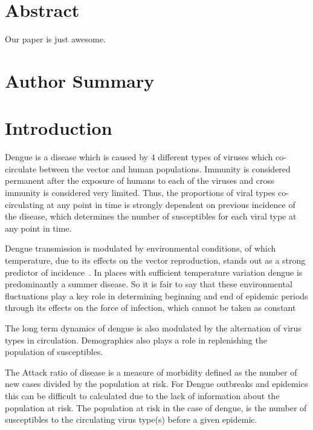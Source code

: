 \section*{Abstract}
Our paper is just awesome.
\section*{Author Summary}

\section*{Introduction}

Dengue is a disease which is caused by 4 different types of viruses 
which co-circulate between the vector and human populations. Immunity is 
considered permanent after the exposure of humans to each of the viruses and 
cross immunity is considered very limited\cite{halstead_dengue_2007}.
Thus, the proportions of viral types co-circulating at any point in time is 
strongly dependent on previous incidence of the disease, which determines the 
number of susceptibles for each viral type at any point in time.

Dengue transmission is modulated by environmental conditions, of which 
temperature, due to its effects on the 
vector reproduction, stands out as a strong predictor of 
incidence~\cite{honorio_temporal_2009,wu_higher_2009}.
In places with sufficient temperature variation dengue is predominantly a 
summer disease. So it is fair to say that these environmental fluctuations play 
a key role in determining beginning and end of epidemic periods through its 
effects on the force of infection, which cannot be taken as 
constant\cite{reiner_time-varying_2014}

The long term dynamics of dengue is also modulated by the alternation of virus 
types in circulation. Demographics also plays a role in replenishing the 
population of susceptibles. 

The Attack ratio of disease is a measure of morbidity defined as the number of 
new cases divided by the population at risk.
For Dengue outbreaks and epidemics this can be difficult to calculated due to 
the lack of information about the population at risk. The population at risk in 
the case of dengue, is the number of susceptibles to the circulating virus 
type(s) before a given epidemic.

